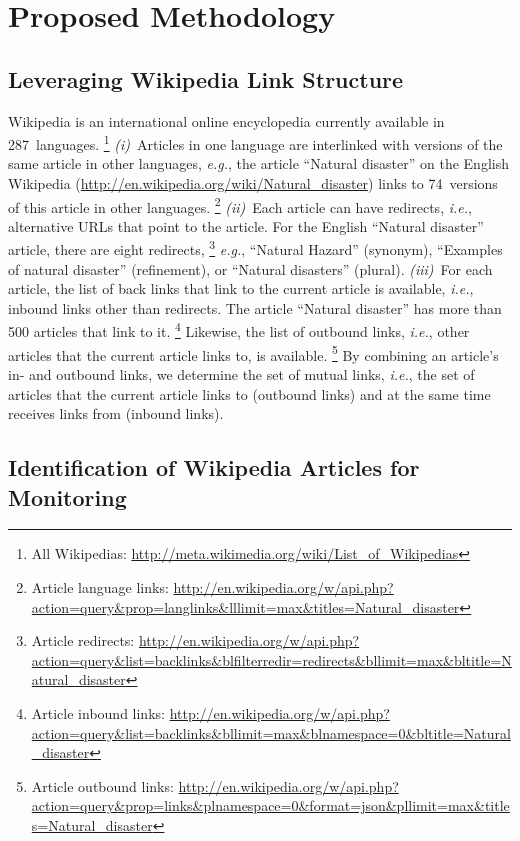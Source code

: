 \documentclass[letterpaper]{article}
\begin{document}
\section{Proposed Methodology}

\subsection{Leveraging Wikipedia Link Structure}

Wikipedia is an international online encyclopedia
currently available in 287~languages.%
\footnote{All Wikipedias: \url{http://meta.wikimedia.org/wiki/List_of_Wikipedias}}
\emph{(i)}~Articles in one language are interlinked with versions of the same article
in other languages, \emph{e.g.}, the article ``Natural disaster''
on the English Wikipedia
(\url{http://en.wikipedia.org/wiki/Natural_disaster})
links to 74~versions of this article in other languages.%
\footnote{Article language links:
\url{http://en.wikipedia.org/w/api.php?action=query&prop=langlinks&lllimit=max&titles=Natural_disaster}}
\emph{(ii)}~Each article can have redirects, \emph{i.e.}, alternative URLs
that point to the article.
For the English ``Natural disaster'' article, there are eight redirects,%
\footnote{Article redirects:
\url{http://en.wikipedia.org/w/api.php?action=query&list=backlinks&blfilterredir=redirects&bllimit=max&bltitle=Natural_disaster}}
\emph{e.g.}, ``Natural Hazard'' (synonym),
``Examples of natural disaster'' (refinement), or
``Natural disasters'' (plural).
\emph{(iii)}~For each article, the list of back links
that link to the current article is available, \emph{i.e.},
inbound links other than redirects.
The article ``Natural disaster'' has more than 500 articles that link to it.%
\footnote{Article inbound links: \url{http://en.wikipedia.org/w/api.php?action=query&list=backlinks&bllimit=max&blnamespace=0&bltitle=Natural_disaster}}
Likewise, the list of outbound links, \emph{i.e.}, other articles
that the current article links to, is available.%
\footnote{Article outbound links: \url{http://en.wikipedia.org/w/api.php?action=query&prop=links&plnamespace=0&format=json&pllimit=max&titles=Natural_disaster}}
By combining an article's in- and outbound links,
we determine the set of mutual links,
\emph{i.e.}, the set of articles that the current article links to (outbound links)
and at the same time receives links from (inbound links).

\subsection{Identification of Wikipedia Articles for Monitoring}
\label{sec:identification-of-monitoring}
\end{document}
